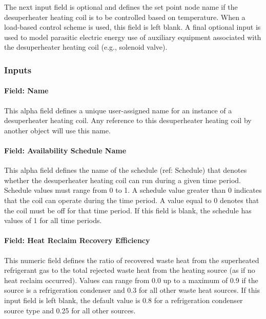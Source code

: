 The next input field is optional and defines the set point node name if the desuperheater heating coil is to be controlled based on temperature. When a load-based control scheme is used, this field is left blank. A final optional input is used to model parasitic electric energy use of auxiliary equipment associated with the desuperheater heating coil (e.g., solenoid valve).

\subsubsection{Inputs}\label{inputs-5-013}

\paragraph{Field: Name}\label{field-name-5-009}

This alpha field defines a unique user-assigned name for an instance of a desuperheater heating coil. Any reference to this desuperheater heating coil by another object will use this name.

\paragraph{Field: Availability Schedule Name}\label{field-availability-schedule-name-009}

This alpha field defines the name of the schedule (ref: Schedule) that denotes whether the desuperheater heating coil can run during a given time period. Schedule values must range from 0 to 1. A schedule value greater than 0 indicates that the coil can operate during the time period. A value equal to 0 denotes that the coil must be off for that time period. If this field is blank, the schedule has values of 1 for all time periods.

\paragraph{Field: Heat Reclaim Recovery Efficiency}\label{field-heat-reclaim-recovery-efficiency}

This numeric field defines the ratio of recovered waste heat from the superheated refrigerant gas to the total rejected waste heat from the heating source (as if no heat reclaim occurred). Values can range from 0.0 up to a maximum of 0.9 if the source is a refrigeration condenser and 0.3 for all other waste heat sources. If this input field is left blank, the default value is 0.8 for a refrigeration condenser source type and 0.25 for all other sources.

